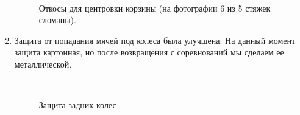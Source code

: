 \begin{enumerate}
	\begin{figure}[H]
		\begin{minipage}[h]{0.2\linewidth}
			\center  
		\end{minipage}
		\begin{minipage}[h]{0.6\linewidth}
			\caption{Откосы для центровки корзины (на фотографии 6 из 5 стяжек сломаны).}
		\end{minipage}
	\end{figure}
	
	\item Защита от попадания мячей под колеса была улучшена. На данный момент защита картонная, но после возвращения с соревнований мы сделаем ее металлической.
	
	\begin{figure}[H]
		\begin{minipage}[h]{0.2\linewidth}
			\center  
		\end{minipage}
		\begin{minipage}[h]{0.6\linewidth}
			\caption{Защита задних колес}
		\end{minipage}
	\end{figure}
	

\end{enumerate}
